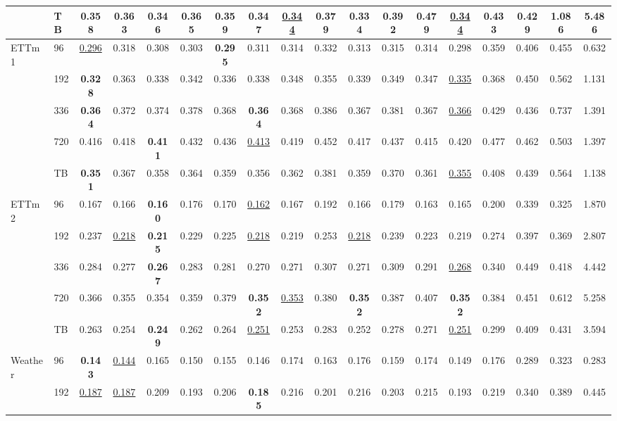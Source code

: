 \begin{table}
\begin{tabular}{@{}llcccccccccccccccc@{}}
 & TB & 0.358 & 0.363 & 0.346 & 0.365 & 0.359 & 0.347 & \underline{0.344} & 0.379 & \textbf{0.334} & 0.392 & 0.479 & \underline{0.344} & 0.433 & 0.429 & 1.086 & 5.486\\
\midrule
\multirow{5}{*}{ETTm1} & 96 & \underline{0.296} & 0.318 & 0.308 & 0.303 & \textbf{0.295} & 0.311 & 0.314 & 0.332 & 0.313 & 0.315 & 0.314 & 0.298 & 0.359 & 0.406 & 0.455 & 0.632\\
 & 192 & \textbf{0.328} & 0.363 & 0.338 & 0.342 & 0.336 & 0.338 & 0.348 & 0.355 & 0.339 & 0.349 & 0.347 & \underline{0.335} & 0.368 & 0.450 & 0.562 & 1.131\\
 & 336 & \textbf{0.364} & 0.372 & 0.374 & 0.378 & 0.368 & \textbf{0.364} & 0.368 & 0.386 & 0.367 & 0.381 & 0.367 & \underline{0.366} & 0.429 & 0.436 & 0.737 & 1.391\\
 & 720 & 0.416 & 0.418 & \textbf{0.411} & 0.432 & 0.436 & \underline{0.413} & 0.419 & 0.452 & 0.417 & 0.437 & 0.415 & 0.420 & 0.477 & 0.462 & 0.503 & 1.397\\
 & TB & \textbf{0.351} & 0.367 & 0.358 & 0.364 & 0.359 & 0.356 & 0.362 & 0.381 & 0.359 & 0.370 & 0.361 & \underline{0.355} & 0.408 & 0.439 & 0.564 & 1.138\\
\midrule
\multirow{5}{*}{ETTm2} & 96 & 0.167 & 0.166 & \textbf{0.160} & 0.176 & 0.170 & \underline{0.162} & 0.167 & 0.192 & 0.166 & 0.179 & 0.163 & 0.165 & 0.200 & 0.339 & 0.325 & 1.870\\
 & 192 & 0.237 & \underline{0.218} & \textbf{0.215} & 0.229 & 0.225 & \underline{0.218} & 0.219 & 0.253 & \underline{0.218} & 0.239 & 0.223 & 0.219 & 0.274 & 0.397 & 0.369 & 2.807\\
 & 336 & 0.284 & 0.277 & \textbf{0.267} & 0.283 & 0.281 & 0.270 & 0.271 & 0.307 & 0.271 & 0.309 & 0.291 & \underline{0.268} & 0.340 & 0.449 & 0.418 & 4.442\\
 & 720 & 0.366 & 0.355 & 0.354 & 0.359 & 0.379 & \textbf{0.352} & \underline{0.353} & 0.380 & \textbf{0.352} & 0.387 & 0.407 & \textbf{0.352} & 0.384 & 0.451 & 0.612 & 5.258\\
 & TB & 0.263 & 0.254 & \textbf{0.249} & 0.262 & 0.264 & \underline{0.251} & 0.253 & 0.283 & 0.252 & 0.278 & 0.271 & \underline{0.251} & 0.299 & 0.409 & 0.431 & 3.594\\
\midrule
\multirow{5}{*}{Weather} & 96 & \textbf{0.143} & \underline{0.144} & 0.165 & 0.150 & 0.155 & 0.146 & 0.174 & 0.163 & 0.176 & 0.159 & 0.174 & 0.149 & 0.176 & 0.289 & 0.323 & 0.283\\
 & 192 & \underline{0.187} & \underline{0.187} & 0.209 & 0.193 & 0.206 & \textbf{0.185} & 0.216 & 0.201 & 0.216 & 0.203 & 0.215 & 0.193 & 0.219 & 0.340 & 0.389 & 0.445\\

\end{tabular}
\end{table}
